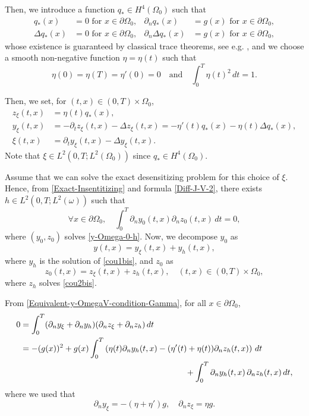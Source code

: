 Then, we introduce a function $q_* \in H^4(\Omega_0)$ such that
\begin{align*}
q_* (x) &= 0\text{ for } x \in \partial \Omega_0,
&\partial_n q_* (x) &= g(x)\text{ for } x \in \partial \Omega_0,
\\
\Delta q_* (x) &= 0\text{ for } x \in \partial \Omega_0,
&\partial_n \Delta q_* (x) &= g(x)\text{ for } x \in \partial \Omega_0,
\end{align*}
whose existence is guaranteed by classical trace theorems, see e.g. \cite[Chap.\,1, Th.\,8.3]{LionsMagenes}, and we choose a smooth non-negative function $\eta = \eta(t)$ such that
\[
\eta(0) = \eta(T) =\eta'(0) = 0\quad\text{and}\quad\int_0^T \eta(t)^2 \, dt = 1.
\]

Then, we set, for $(t,x) \in (0,T) \times \Omega_0$,
\begin{align*}
z_\xi(t,x) &= \eta(t) q_*(x),\\
y_\xi(t,x) &= {- \partial_t z_\xi(t,x) - \Delta z_\xi(t,x)}
= - \eta'(t) q_*(x) - \eta(t) \Delta q_*(x),
\\
\xi(t,x) &= \partial_t y_\xi(t,x) - \Delta y_\xi(t,x).
\end{align*}
{Note that $\xi \in L^2(0,T; L^2(\Omega_0))$ since $q_* \in H^4(\Omega_0)$.}

Assume that we can solve the exact desensitizing problem for this choice of $\xi$. Hence, from \eqref{Exact-Insentitizing} and formula \eqref{Diff-J-V-2}, there exists $h \in L^2(0,T; L^2(\omega))$ such that
\begin{equation}
\label{Equivalent-y-OmegaV-condition-Gamma}
\forall x \in \partial \Omega_0, \quad \int_0^T \partial_n y_0(t,x) \partial_n z_0(t,x) \, dt = 0,
\end{equation}
where $(y_0, z_0)$ solves \eqref{y-Omega-0-h}.
Now, we decompose $y_0$ as
\begin{equation*}
y(t,x) = y_\xi (t,x) + y_h(t,x),
\end{equation*}
where $y_h$ is the solution of \eqref{cou1bis}, and $z_0$ as
\begin{equation*}
z_0(t,x) = z_\xi(t,x) + z_h(t,x), \quad (t,x) \in (0,T) \times \Omega_0,
\end{equation*}
where $z_h$ solves \eqref{cou2bis}.

From \eqref{Equivalent-y-OmegaV-condition-Gamma}, for all $x \in \partial \Omega_0$,
\begin{align*}
0 &= \int_0^T (\partial_n y_\xi + \partial_n y_h) (\partial_n z_\xi + \partial_n z_h) \, dt
\\
&=
- (g(x))^2 + g(x) \int_0^T \left(\eta(t) \partial_n y_h(t,x) - (\eta' (t)+ \eta(t)) \partial_n z_h(t,x) \right) \, dt\\
&\hspace*{7cm}+ \int_0^T \partial_n y_h(t,x)\, \partial_n z_h(t,x) \, dt,
\end{align*}
where we used that
\[
\partial_n y_\xi = - (\eta + \eta') g, \quad \partial_n z_\xi = \eta g.
\]

